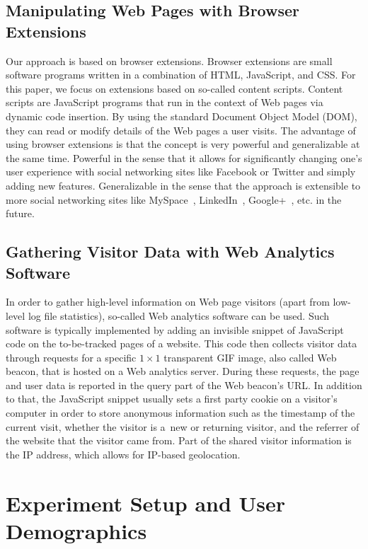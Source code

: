 \documentclass{iosart2c}
\begin{document}
\subsection{Manipulating Web Pages with Browser Extensions}
Our approach is based on browser extensions.
Browser extensions are small software programs written in a combination of HTML, JavaScript, and CSS.
For this paper, we focus on extensions based on so-called content scripts.
Content scripts are JavaScript programs that run in the context of Web pages via dynamic code insertion.
By using the standard Document Object Model (DOM), they can read or modify details of the Web pages a user visits.
The advantage of using browser extensions is that the concept is very powerful and generalizable at the same time.
Powerful in the sense that it allows for significantly changing one's user experience with social networking sites like Facebook or Twitter and simply adding new features.
Generalizable in the sense that the approach is extensible to more social networking sites like MySpace~\cite{MySpace}, LinkedIn~\cite{LinkedIn}, Google+~\cite{GooglePlus}, etc. in the future.

\subsection{Gathering Visitor Data with Web Analytics Software}
In order to gather high-level information on Web page visitors (apart from low-level log file statistics), so-called Web analytics software can be used.
Such software is typically implemented by adding an invisible snippet of JavaScript code on the to-be-tracked pages of a website.
This code then collects visitor data through requests for a specific $\mathit{1} \times \mathit{1}$ transparent GIF image, also called Web beacon, that is hosted on a Web analytics server.
During these requests, the page and user data is reported in the query part of the Web beacon's URL.
In addition to that, the JavaScript snippet usually sets a first party cookie on a visitor's computer in order to store anonymous information such as the timestamp of the current visit, whether the visitor is a~new or returning visitor, and the referrer of the website that the visitor came from.
Part of the shared visitor information is the IP address, which allows for IP-based geolocation.

\section{Experiment Setup and User Demographics} \label{sec:userdemographics}
\end{document}
